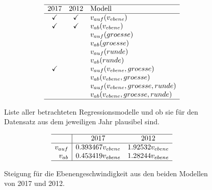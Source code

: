 \begin{figure}
\[\begin{array}{cc l}
	\hline
	 2017 & 2012 & \text{Modell} \\
	\hline
	\checkmark&\checkmark& v_{auf}(v_{ebene}) \\
	\checkmark&\checkmark& v_{ab}(v_{ebene})\\
	
	&& v_{auf}(groesse) \\
	&& v_{ab}(groesse)  \\
	
	&& v_{auf}(runde) \\
	&& v_{ab}(runde)  \\	
	
	\checkmark&& v_{auf}(v_{ebene}, groesse) \\
	&& v_{ab}(v_{ebene}, groesse)  \\
		
	&& v_{auf}(v_{ebene}, groesse, runde)  \\
	&& v_{ab}(v_{ebene}, groesse, runde) \\	
	\hline
\end{array}\]
\caption{Liste aller betrachteten Regressionsmodelle und ob sie für den Datensatz aus dem jeweiligen Jahr plausibel sind.} \label{fig:plausibilisierung-2017-2012}
\end{figure}


\begin{figure}
	\[\begin{array}{r | cc}
	\hline
	 & \text{2017} & \text{2012} \\
	\hline
	v_{auf} & 0.393467 v_{ebene}& 1.92532 v_{ebene}  \\
	v_{ab} & 0.453419 v_{ebene}&1.28244 v_{ebene}  \\
	\hline
	\end{array}\]
	\caption{Steigung für die Ebenengeschwindigkeit aus den beiden Modellen von 2017 und 2012.} \label{fig:steigung-2017-2012}
\end{figure}

